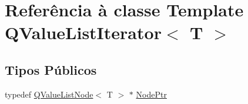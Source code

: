 \hypertarget{class_q_value_list_iterator}{\section{Referência à classe Template Q\-Value\-List\-Iterator$<$ T $>$}
\label{class_q_value_list_iterator}
}
\subsection*{Tipos Públicos}
\begin{DoxyCompactItemize}
\item 
typedef \hyperlink{class_q_value_list_node}{Q\-Value\-List\-Node}$<$ T $>$ $\ast$ \hyperlink{class_q_value_list_iterator_a33149bd41c7bb5c96791c9455305e769}{Node\-Ptr}
\end{DoxyCompactItemize}
